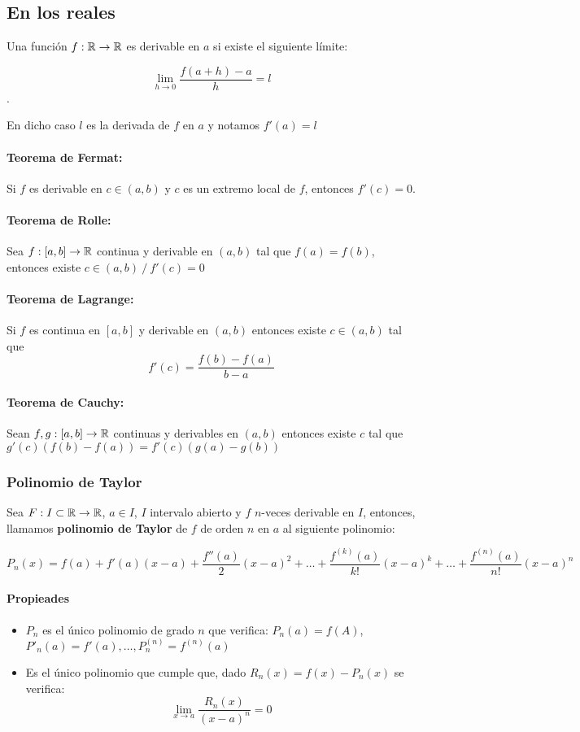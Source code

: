 \subsection{En los reales}
Una función $f : \mathbb{R}\rightarrow \mathbb{R}$ es derivable en $a$ si existe el siguiente límite:

$$\lim_{h\to 0} \frac{f(a+h) - a}{h} = l$$.

En dicho caso $l$ es la derivada de $f$ en $a$ y notamos $f'(a) = l$

\paragraph{Teorema de Fermat: } Si $f$ es derivable en $c\in(a,b)$ y $c$ es un extremo local de $f$, entonces $f'(c) = 0$.

\paragraph{Teorema de Rolle:} Sea $f : [a,b]\rightarrow \mathbb{R}$ continua y derivable en $(a,b)$ tal que $f(a) = f(b)$, entonces existe $c\in(a,b)~/~f'(c) = 0$

\paragraph{Teorema de Lagrange:} Si $f$ es continua en $[a,b]$ y derivable en $(a, b)$ entonces existe $c\in(a, b)$ tal que
$$f'(c) = \frac{f(b)-f(a)}{b-a}$$

\paragraph{Teorema de Cauchy:} Sean $f,g:[a,b]\to\mathbb{R}$ continuas y derivables en $(a,b)$ entonces existe $c$ tal que $g'(c)(f(b)-f(a)) = f'(c)(g(a)-g(b))$

\subsubsection{Polinomio de Taylor}
Sea $F:I\subset\mathbb{R}\to\mathbb{R}$, $a\in I$, $I$ intervalo abierto y $f$ $n$-veces derivable en $I$, entonces, llamamos \textbf{polinomio de Taylor} de $f$ de orden $n$ en $a$ al siguiente polinomio:

$$P_n(x) = f(a) + f'(a)(x-a) + \frac{f''(a)}{2}(x-a)^2 + \dots + \frac{f^{(k)}(a)}{k!}(x-a)^k + \dots + \frac{f^{(n)}(a)}{n!}(x-a)^n$$

\paragraph{Propieades}
\begin{itemize}
\item $P_n$ es el único polinomio de grado $n$ que verifica: $P_n(a) = f(A)$, $P'_n(a) = f'(a),\dots,P^{(n)}_n=f^{(n)}(a)$
\item Es el único polinomio que cumple que, dado $R_n(x)  = f(x) - P_n(x)$ se verifica:
$$\lim_{x\to a}\frac{R_n(x)}{(x-a)^n} = 0$$
\end{itemize}

